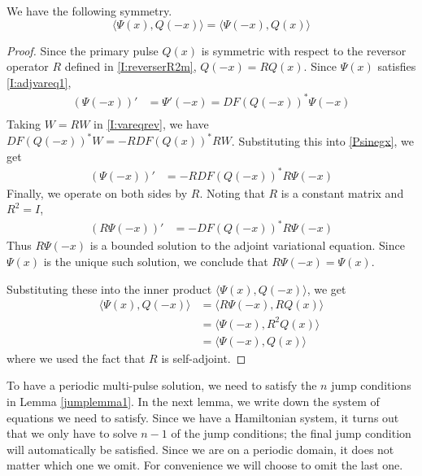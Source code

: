 \documentclass[thesis.tex]{subfiles}
\begin{document}
\begin{lemma}\label{IPsymmlemma}
We have the following symmetry.
\begin{equation}\label{IPsymm}
\langle \Psi(x), Q(-x) \rangle = \langle \Psi(-x), Q(x) \rangle
\end{equation}
\begin{proof}
Since the primary pulse $Q(x)$ is symmetric with respect to the reversor operator $R$ defined in \eqref{I:reverserR2m}, $Q(-x) = RQ(x)$. Since $\Psi(x)$ satisfies \eqref{I:adjvareq1},
\begin{align}\label{Psinegx}
(\Psi(-x))' &= \Psi'(-x) = DF(Q(-x))^* \Psi(-x) \\
\end{align}
Taking $W = RW$ in \eqref{I:vareqrev}, we have $DF(Q(-x))^* W = -R DF(Q(x))^* R W$. Substituting this into \eqref{Psinegx}, we get
\begin{align*}
(\Psi(-x))' &= -R DF(Q(-x))^* R \Psi(-x)
\end{align*}
Finally, we operate on both sides by $R$. Noting that $R$ is a constant matrix and $R^2 = I$, 
\begin{align*}
(R \Psi(-x))' &= -DF(Q(-x))^* R \Psi(-x)
\end{align*}
Thus $R \Psi(-x)$ is a bounded solution to the adjoint variational equation. Since $\Psi(x)$ is the unique such solution, we conclude that $R \Psi(-x) = \Psi(x)$.

Substituting these into the inner product $\langle \Psi(x), Q(-x) \rangle$, we get
\begin{align*}
\langle \Psi(x), Q(-x) \rangle
&= \langle R \Psi(-x), R Q(x) \rangle \\
&= \langle \Psi(-x), R^2 Q(x) \rangle \\
&= \langle \Psi(-x), Q(x) \rangle
\end{align*}
where we used the fact that $R$ is self-adjoint.
\end{proof}
\end{lemma}

To have a periodic multi-pulse solution, we need to satisfy the $n$ jump conditions in Lemma \ref{jumplemma1}. In the next lemma, we write down the system of equations we need to satisfy. Since we have a Hamiltonian system, it turns out that we only have to solve $n-1$ of the jump conditions; the final jump condition will automatically be satisfied. Since we are on a periodic domain, it does not matter which one we omit. For convenience we will choose to omit the last one.
\end{document}
